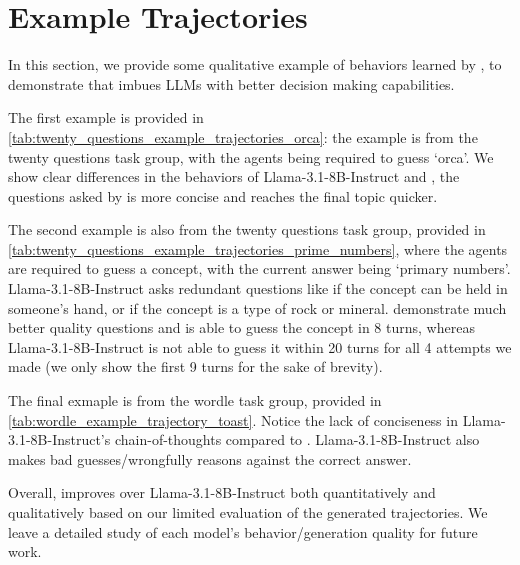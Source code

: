\newpage 

\section{Example Trajectories} \label{appendixSection:example_trajectories}

In this section, we provide some qualitative example of behaviors learned by \ours{}, to demonstrate that \ours{} imbues LLMs with better decision making capabilities. 

The first example is provided in \cref{tab:twenty_questions_example_trajectories_orca}: the example is from the twenty questions task group, with the agents being required to guess `orca'. We show clear differences in the behaviors of Llama-3.1-8B-Instruct and \ours{}, the questions asked by \ours{} is more concise and reaches the final topic quicker. 

The second example is also from the twenty questions task group, provided in \cref{tab:twenty_questions_example_trajectories_prime_numbers}, where the agents are required to guess a concept, with the current answer being `primary numbers'. Llama-3.1-8B-Instruct asks redundant questions like if the concept can be held in someone's hand, or if the concept is a type of rock or mineral. \ours{} demonstrate much better quality questions and is able to guess the concept in 8 turns, whereas Llama-3.1-8B-Instruct is not able to guess it within 20 turns for all 4 attempts we made (we only show the first 9 turns for the sake of brevity).

The final exmaple is from the wordle task group, provided in \cref{tab:wordle_example_trajectory_toast}. Notice the lack of conciseness in Llama-3.1-8B-Instruct's chain-of-thoughts compared to \ours{}. Llama-3.1-8B-Instruct also makes bad guesses/wrongfully reasons against the correct answer. 

Overall, \ours{} improves over Llama-3.1-8B-Instruct both quantitatively and qualitatively based on our limited evaluation of the generated trajectories. We leave a detailed study of each model's behavior/generation quality for future work.

\newpage

